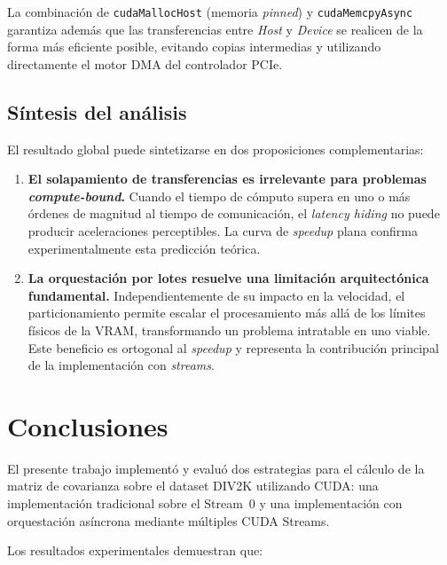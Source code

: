 \documentclass[12pt, a4paper]{article}
\begin{document}
La combinación de \texttt{cudaMallocHost} (memoria \textit{pinned}) y
\texttt{cudaMemcpyAsync} garantiza además que las transferencias entre
\textit{Host} y \textit{Device} se realicen de la forma más eficiente posible,
evitando copias intermedias y utilizando directamente el motor DMA del
controlador PCIe.

\subsection{Síntesis del análisis}

El resultado global puede sintetizarse en dos proposiciones complementarias:

\begin{enumerate}
    \item \textbf{El solapamiento de transferencias es irrelevante para
    problemas \textit{compute-bound}.} Cuando el tiempo de cómputo supera en
    uno o más órdenes de magnitud al tiempo de comunicación, el \textit{latency
    hiding} no puede producir aceleraciones perceptibles. La curva de
    \textit{speedup} plana confirma experimentalmente esta predicción teórica.

    \item \textbf{La orquestación por lotes resuelve una limitación
    arquitectónica fundamental.} Independientemente de su impacto en la
    velocidad, el particionamiento permite escalar el procesamiento más allá
    de los límites físicos de la VRAM, transformando un problema intratable
    en uno viable. Este beneficio es ortogonal al \textit{speedup} y
    representa la contribución principal de la implementación con
    \textit{streams}.
\end{enumerate}

\section{Conclusiones}

El presente trabajo implementó y evaluó dos estrategias para el cálculo de la
matriz de covarianza sobre el dataset DIV2K utilizando CUDA: una
implementación tradicional sobre el Stream~0 y una implementación con
orquestación asíncrona mediante múltiples CUDA Streams.

Los resultados experimentales demuestran que:
\end{document}
